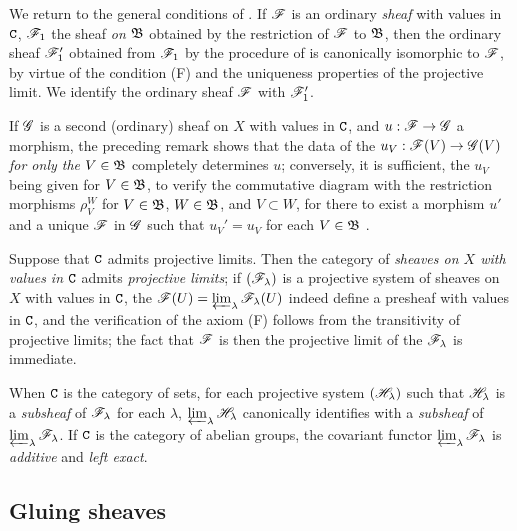 \begin{env}[3.2.5]
\label{0.3.2.5}
We return to the general conditions of . If $\mathscr{F}$ is an
ordinary \emph{sheaf} with values in $\mathtt{C}$, $\mathscr{F}_1$ the sheaf \emph{on
$\mathfrak{B}$} obtained by the restriction of $\mathscr{F}$ to $\mathfrak{B}$, then
the ordinary sheaf $\mathscr{F}_1'$ obtained from $\mathscr{F}_1$ by the procedure of
 is canonically isomorphic to $\mathscr{F}$, by virtue of the
condition (F) and the uniqueness properties of the projective limit. We identify
the ordinary sheaf $\mathscr{F}$ with $\mathscr{F}_1'$.

If $\mathscr{G}$ is a second (ordinary) sheaf on $X$ with values in $\mathtt{C}$, and
$u:\sh{F}\to\sh{G}$ a morphism, the preceding remark shows that the data of the
$u_V:\sh{F}(V)\to\sh{G}(V)$ \emph{for only the $V\in\mathfrak{B}$} completely
determines $u$; conversely, it is sufficient, the $u_V$ being given for
$V\in\mathfrak{B}$, to verify the commutative diagram with the restriction
morphisms $\rho_V^W$ for $V\in\mathfrak{B}$, $W\in\mathfrak{B}$, and
$V\subset W$, for there to exist a morphism $u'$ and a unique $\mathscr{F}$ in
$\mathscr{G}$ such that $u_V'=u_V$ for each $V\in\mathfrak{B}$ .
\end{env}

\begin{env}[3.2.6]
\label{0.3.2.6}
Suppose that $\mathtt{C}$ admits projective limits. Then the category of \emph{sheaves
on $X$ with values in $\mathtt{C}$} admits \emph{projective limits}; if
$(\mathscr{F}_\lambda)$ is a projective system of sheaves on $X$ with values in $\mathtt{C}$,
the $\mathscr{F}(U)=\varprojlim_\lambda\mathscr{F}_\lambda(U)$ indeed define a presheaf
with values in $\mathtt{C}$, and the verification of the axiom (F) follows from the
transitivity of projective limits; the fact that $\mathscr{F}$ is then the projective
limit of the $\mathscr{F}_\lambda$ is immediate.

When $\mathtt{C}$ is the category of sets, for each projective system
$(\mathscr{H}_\lambda)$ such
that $\mathscr{H}_\lambda$ is a \emph{subsheaf} of $\mathscr{F}_\lambda$ for each
$\lambda$, $\varprojlim_\lambda\mathscr{H}_\lambda$ canonically identifies with
a \emph{subsheaf} of $\varprojlim_\lambda\mathscr{F}_\lambda$. If $\mathtt{C}$ is the
category of abelian groups, the covariant functor
$\varprojlim_\lambda\mathscr{F}_\lambda$ is \emph{additive} and \emph{left exact}.
\end{env}

\subsection{Gluing sheaves}
\label{subsection:0.3.3}

